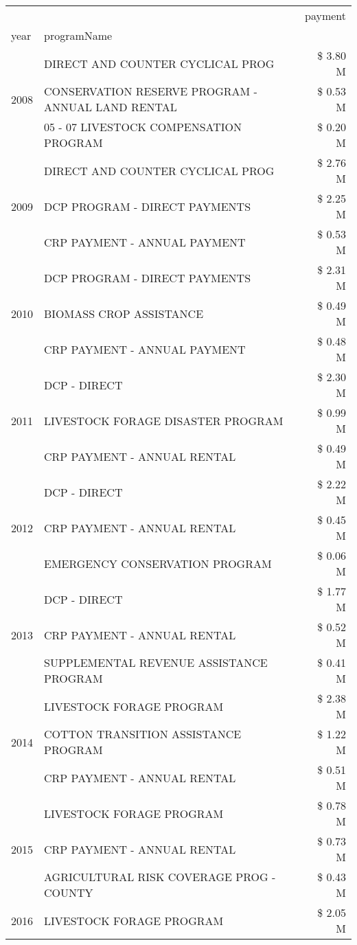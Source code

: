 \begin{tabular}{llr}
\toprule
 &  & payment \\
year & programName &  \\
\midrule
\multirow[t]{3}{*}{2008} & DIRECT AND COUNTER CYCLICAL PROG & \$ 3.80 M \\
 & CONSERVATION RESERVE PROGRAM - ANNUAL LAND RENTAL & \$ 0.53 M \\
 & 05 - 07 LIVESTOCK COMPENSATION PROGRAM & \$ 0.20 M \\
\cline{1-3}
\multirow[t]{3}{*}{2009} & DIRECT AND COUNTER CYCLICAL PROG & \$ 2.76 M \\
 & DCP PROGRAM - DIRECT PAYMENTS & \$ 2.25 M \\
 & CRP PAYMENT - ANNUAL PAYMENT & \$ 0.53 M \\
\cline{1-3}
\multirow[t]{3}{*}{2010} & DCP PROGRAM - DIRECT PAYMENTS & \$ 2.31 M \\
 & BIOMASS CROP ASSISTANCE & \$ 0.49 M \\
 & CRP PAYMENT - ANNUAL PAYMENT & \$ 0.48 M \\
\cline{1-3}
\multirow[t]{3}{*}{2011} & DCP - DIRECT & \$ 2.30 M \\
 & LIVESTOCK FORAGE DISASTER PROGRAM & \$ 0.99 M \\
 & CRP PAYMENT - ANNUAL RENTAL & \$ 0.49 M \\
\cline{1-3}
\multirow[t]{3}{*}{2012} & DCP - DIRECT & \$ 2.22 M \\
 & CRP PAYMENT - ANNUAL RENTAL & \$ 0.45 M \\
 & EMERGENCY CONSERVATION PROGRAM & \$ 0.06 M \\
\cline{1-3}
\multirow[t]{3}{*}{2013} & DCP - DIRECT & \$ 1.77 M \\
 & CRP PAYMENT - ANNUAL RENTAL & \$ 0.52 M \\
 & SUPPLEMENTAL REVENUE ASSISTANCE PROGRAM & \$ 0.41 M \\
\cline{1-3}
\multirow[t]{3}{*}{2014} & LIVESTOCK FORAGE PROGRAM & \$ 2.38 M \\
 & COTTON TRANSITION ASSISTANCE PROGRAM & \$ 1.22 M \\
 & CRP PAYMENT - ANNUAL RENTAL & \$ 0.51 M \\
\cline{1-3}
\multirow[t]{3}{*}{2015} & LIVESTOCK FORAGE PROGRAM & \$ 0.78 M \\
 & CRP PAYMENT - ANNUAL RENTAL & \$ 0.73 M \\
 & AGRICULTURAL RISK COVERAGE PROG - COUNTY & \$ 0.43 M \\
\cline{1-3}
\multirow[t]{3}{*}{2016} & LIVESTOCK FORAGE PROGRAM & \$ 2.05 M \\

\end{tabular}
